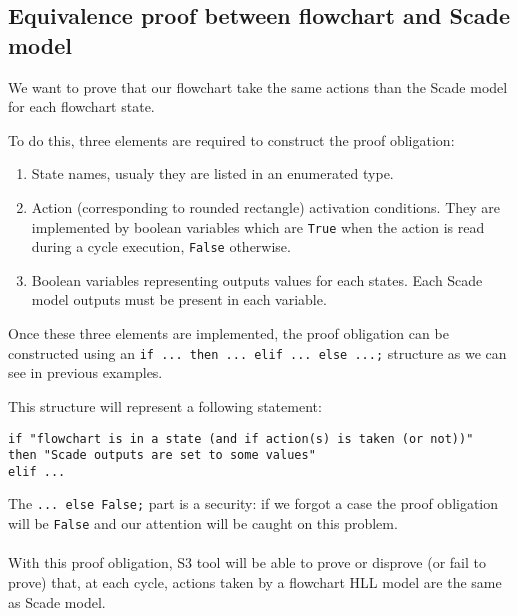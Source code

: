 \subsection{Equivalence proof between flowchart and Scade model}
We want to prove that our flowchart take the same actions than the
Scade model for each flowchart state.

To do this, three elements are required to construct the proof
obligation:
\begin{enumerate}
\item State names, usualy they are listed in an enumerated type.
\item Action (corresponding to rounded rectangle) activation
  conditions. They are implemented by boolean variables which are
  \texttt{True} when the action is read during a cycle execution,
  \texttt{False} otherwise.
\item Boolean variables representing outputs values for each
  states. Each Scade model outputs must be present in each variable.
\end{enumerate}

Once these three elements are implemented, the proof obligation can be
constructed using an \texttt{if ... then ... elif ... else ...;}
structure as we can see in previous examples.

This structure will represent a following statement:
\begin{verbatim}
if "flowchart is in a state (and if action(s) is taken (or not))"
then "Scade outputs are set to some values" 
elif ...
\end{verbatim}

The \texttt{... else False;} part is a security: if we forgot a case the
proof obligation will be \texttt{False} and our attention will be
caught on this problem.

\paragraph{}
With this proof obligation, S3 tool will be able to prove or disprove
(or fail to prove) that, at each cycle, actions taken by a flowchart
HLL model are the same as Scade model.
